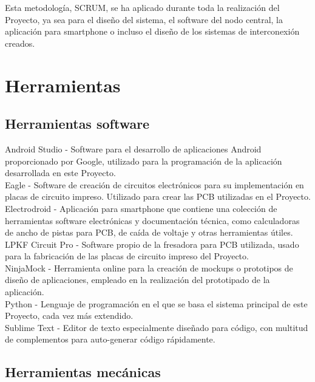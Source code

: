 Esta metodología, SCRUM, se ha aplicado durante toda la realización del Proyecto, ya sea para el diseño del sistema, el software del nodo central, la aplicación para smartphone o incluso el diseño de los sistemas de interconexión creados.

\section{Herramientas}

    \subsection{Herramientas software}
    
    Android Studio - Software para el desarrollo de aplicaciones Android proporcionado por Google, utilizado para la programación de la aplicación desarrollada en este Proyecto. \\
    
    Eagle - Software de creación de circuitos electrónicos para su implementación en placas de circuito impreso. Utilizado para crear las PCB utilizadas en el Proyecto. \\
    
    Electrodroid - Aplicación para smartphone que contiene una colección de herramientas software electrónicas y documentación técnica, como calculadoras de ancho de pistas para PCB, de caída de voltaje y otras herramientas útiles. \\
    
    LPKF Circuit Pro - Software propio de la fresadora para PCB utilizada, usado para la fabricación de las placas de circuito impreso del Proyecto. \\
    
    NinjaMock - Herramienta online para la creación de mockups o prototipos de diseño de aplicaciones, empleado en la realización del prototipado de la aplicación. \\
    
    Python - Lenguaje de programación en el que se basa el sistema principal de este Proyecto, cada vez más extendido. \\
    
    Sublime Text - Editor de texto especialmente diseñado para código, con multitud de complementos para auto-generar código rápidamente.
    
    \subsection{Herramientas mecánicas}
    
